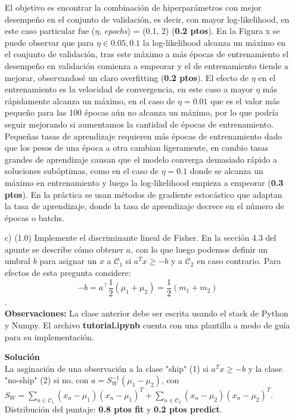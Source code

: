 \documentclass[11pt,letterpaper]{article}
\begin{document}
\begin{enumerate}
El objetivo es encontrar la combinación de hiperparámetros con mejor desempeño en el conjunto de validación, es decir, con mayor log-likelihood, en este caso particular fue ($\eta$, \textit{epochs}) = (0.1, 2) (\textbf{0.2 ptos}). En la Figura x se puede observar que para $\eta \in {0.05, 0.1}$ la log-likelihood alcanza un máximo en el conjunto de validación, tras este máximo a más épocas de entrenamiento el desempeño en validación comienza a empeorar y el de entrenamiento tiende a mejorar, observandosé un claro overfitting (\textbf{0.2 ptos}). El efecto de $\eta$ en el entrenamiento es la velocidad de convergencia, en este caso a mayor $\eta$ más rápidamente alcanza un máximo, en el caso de $\eta = 0.01$ que es el valor más pequeño para las 100 épocas aún no alcanza un máximo, por lo que podría seguir mejorando si aumentamos la cantidad de épocas de entrenamiento. Pequeñas tasas de aprendizaje requieren más épocas de entrenamiento dado que los pesos de una época a otra cambian ligeramente, en cambio tasas grandes de aprendizaje causan que el modelo converga demasiado rápido a soluciones subóptimas, como en el caso de $\eta=0.1$ donde se alcanza un máximo en entrenamiento y luego la log-likelihood empieza a empeorar (\textbf{0.3 ptos}). En la práctica se usan métodos de gradiente estocástico que adaptan la tasa de aprendizaje, donde la tasa de aprendizaje decrece en el número de épocas o batchs.

\item [c)] (1.0) Implemente el discriminante lineal de Fisher. En la sección 4.3 del apunte se describe cómo obtener $a$, con lo que luego podemos definir un umbral $b$ para asignar un $x$ a $\mathcal{C}_{1}$ si $a^{T}x\geq-b$ y a $\mathcal{C}_{2}$ en caso contrario. Para efectos de esta pregunta considere:
\begin{equation*}
    -b=a^{\top}\frac{1}{2}(\mu_{1}+\mu_{2})=\frac{1}{2}(m_{1}+m_{2})
\end{equation*}.\\ 
\textbf{Observaciones:} La clase anterior debe ser escrita usando el stack de Python y Numpy. El archivo \textbf{tutorial.ipynb} cuenta con una plantilla a modo de guía para su implementación. 

\textbf{Solución}\\
La asginación de una observación a la clase "ship" (1) si $a^{T}x\geq -b$ y la clase "no-ship" (2) si no, con $a=S_{W}^{-1}(\mu_{1}-\mu_{2})$, con $S_W =\sum_{n\in \mathcal{C}_{1}}(x_{n}-\mu_{1})(x_{n}-\mu_{1})^{T}+\sum_{n\in \mathcal{C}_{2}}(x_{n}-\mu_{2})(x_{n}-\mu_{2})^{T}$. Distribución del puntaje: \textbf{0.8 ptos fit} y \textbf{0.2 ptos predict}.


\end{enumerate}
\end{document}
